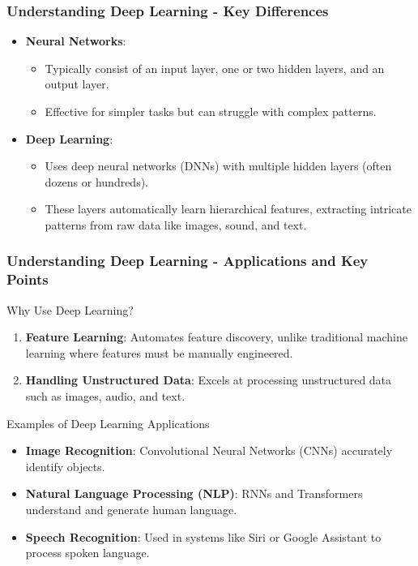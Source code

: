 \documentclass[aspectratio=169]{beamer}
\begin{document}
\begin{frame}[fragile]
  \frametitle{Understanding Deep Learning - Key Differences}
  \begin{itemize}
    \item \textbf{Neural Networks}: 
    \begin{itemize}
      \item Typically consist of an input layer, one or two hidden layers, and an output layer.
      \item Effective for simpler tasks but can struggle with complex patterns.
    \end{itemize}
    
    \item \textbf{Deep Learning}:
    \begin{itemize}
      \item Uses deep neural networks (DNNs) with multiple hidden layers (often dozens or hundreds).
      \item These layers automatically learn hierarchical features, extracting intricate patterns from raw data like images, sound, and text.
    \end{itemize}
  \end{itemize}
\end{frame}

\begin{frame}[fragile]
  \frametitle{Understanding Deep Learning - Applications and Key Points}
  \begin{block}{Why Use Deep Learning?}
    \begin{enumerate}
      \item \textbf{Feature Learning}: Automates feature discovery, unlike traditional machine learning where features must be manually engineered.
      \item \textbf{Handling Unstructured Data}: Excels at processing unstructured data such as images, audio, and text.
    \end{enumerate}
  \end{block}

  \begin{block}{Examples of Deep Learning Applications}
    \begin{itemize}
      \item \textbf{Image Recognition}: Convolutional Neural Networks (CNNs) accurately identify objects.
      \item \textbf{Natural Language Processing (NLP)}: RNNs and Transformers understand and generate human language.
      \item \textbf{Speech Recognition}: Used in systems like Siri or Google Assistant to process spoken language.
    \end{itemize}
  \end{block}
\end{frame}
\end{document}
